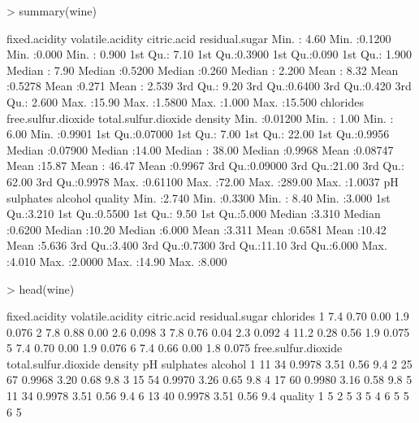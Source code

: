 \documentclass{article}
\begin{document}
\begin{Schunk}
\begin{Sinput}
> summary(wine)
\end{Sinput}
\begin{Soutput}
 fixed.acidity   volatile.acidity  citric.acid    residual.sugar  
 Min.   : 4.60   Min.   :0.1200   Min.   :0.000   Min.   : 0.900  
 1st Qu.: 7.10   1st Qu.:0.3900   1st Qu.:0.090   1st Qu.: 1.900  
 Median : 7.90   Median :0.5200   Median :0.260   Median : 2.200  
 Mean   : 8.32   Mean   :0.5278   Mean   :0.271   Mean   : 2.539  
 3rd Qu.: 9.20   3rd Qu.:0.6400   3rd Qu.:0.420   3rd Qu.: 2.600  
 Max.   :15.90   Max.   :1.5800   Max.   :1.000   Max.   :15.500  
   chlorides       free.sulfur.dioxide total.sulfur.dioxide    density      
 Min.   :0.01200   Min.   : 1.00       Min.   :  6.00       Min.   :0.9901  
 1st Qu.:0.07000   1st Qu.: 7.00       1st Qu.: 22.00       1st Qu.:0.9956  
 Median :0.07900   Median :14.00       Median : 38.00       Median :0.9968  
 Mean   :0.08747   Mean   :15.87       Mean   : 46.47       Mean   :0.9967  
 3rd Qu.:0.09000   3rd Qu.:21.00       3rd Qu.: 62.00       3rd Qu.:0.9978  
 Max.   :0.61100   Max.   :72.00       Max.   :289.00       Max.   :1.0037  
       pH          sulphates         alcohol         quality     
 Min.   :2.740   Min.   :0.3300   Min.   : 8.40   Min.   :3.000  
 1st Qu.:3.210   1st Qu.:0.5500   1st Qu.: 9.50   1st Qu.:5.000  
 Median :3.310   Median :0.6200   Median :10.20   Median :6.000  
 Mean   :3.311   Mean   :0.6581   Mean   :10.42   Mean   :5.636  
 3rd Qu.:3.400   3rd Qu.:0.7300   3rd Qu.:11.10   3rd Qu.:6.000  
 Max.   :4.010   Max.   :2.0000   Max.   :14.90   Max.   :8.000  
\end{Soutput}
\end{Schunk}

\begin{Schunk}
\begin{Sinput}
> head(wine)
\end{Sinput}
\begin{Soutput}
  fixed.acidity volatile.acidity citric.acid residual.sugar chlorides
1           7.4             0.70        0.00            1.9     0.076
2           7.8             0.88        0.00            2.6     0.098
3           7.8             0.76        0.04            2.3     0.092
4          11.2             0.28        0.56            1.9     0.075
5           7.4             0.70        0.00            1.9     0.076
6           7.4             0.66        0.00            1.8     0.075
  free.sulfur.dioxide total.sulfur.dioxide density   pH sulphates alcohol
1                  11                   34  0.9978 3.51      0.56     9.4
2                  25                   67  0.9968 3.20      0.68     9.8
3                  15                   54  0.9970 3.26      0.65     9.8
4                  17                   60  0.9980 3.16      0.58     9.8
5                  11                   34  0.9978 3.51      0.56     9.4
6                  13                   40  0.9978 3.51      0.56     9.4
  quality
1       5
2       5
3       5
4       6
5       5
6       5
\end{Soutput}
\end{Schunk}
\end{document}
